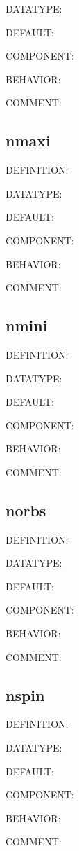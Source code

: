 {\color{green}DATATYPE:}

{\color{blue}DEFAULT:}

{\color{brown}COMPONENT:}

{\color{purple}BEHAVIOR:}

{\color{olive}COMMENT:}

\subsection{nmaxi}
{\color{red}DEFINITION:}

{\color{green}DATATYPE:}

{\color{blue}DEFAULT:}

{\color{brown}COMPONENT:}

{\color{purple}BEHAVIOR:}

{\color{olive}COMMENT:}

\subsection{nmini}
{\color{red}DEFINITION:}

{\color{green}DATATYPE:}

{\color{blue}DEFAULT:}

{\color{brown}COMPONENT:}

{\color{purple}BEHAVIOR:}

{\color{olive}COMMENT:}

\subsection{norbs}
{\color{red}DEFINITION:}

{\color{green}DATATYPE:}

{\color{blue}DEFAULT:}

{\color{brown}COMPONENT:}

{\color{purple}BEHAVIOR:}

{\color{olive}COMMENT:}

\subsection{nspin}
{\color{red}DEFINITION:}

{\color{green}DATATYPE:}

{\color{blue}DEFAULT:}

{\color{brown}COMPONENT:}

{\color{purple}BEHAVIOR:}

{\color{olive}COMMENT:}
